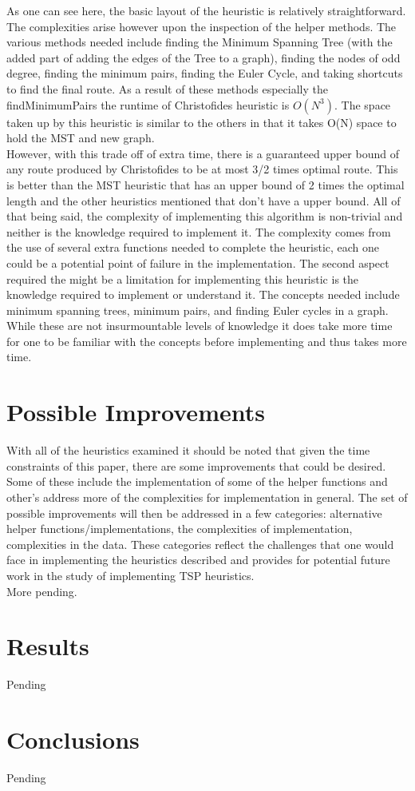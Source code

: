 \documentclass[midd]{thesis}
\newcommand{\tab}{\hspace*{2em}}
\begin{document}
\tab As one can see here, the basic layout of the heuristic is relatively straightforward. The complexities arise however upon the inspection of the helper methods. The various methods needed include finding the Minimum Spanning Tree (with the added part of adding the edges of the Tree to a graph), finding the nodes of odd degree, finding the minimum pairs, finding the Euler Cycle, and taking shortcuts to find the final route. As a result of these methods especially the findMinimumPairs the runtime of Christofides heuristic is $O(N^3)$. The space taken up by this heuristic is similar to the others in that it takes O(N) space to hold the MST and new graph. \\
\tab However, with this trade off of extra time, there is a guaranteed upper bound of any route produced by Christofides to be at most 3/2 times optimal route. This is better than the MST heuristic that has an upper bound of 2 times the optimal length and the other heuristics mentioned that don't have a upper bound. All of that being said, the complexity of implementing this algorithm is non-trivial and neither is the knowledge required to implement it. The complexity comes from the use of several extra functions needed to  complete the heuristic, each one could be a potential point of failure in the implementation. The second aspect required the might be a limitation for implementing this heuristic is the knowledge required to implement or understand it. The concepts needed include minimum spanning trees, minimum pairs, and finding Euler cycles in a graph. While these are not insurmountable levels of knowledge it does take more time for one to be familiar with the concepts before implementing and thus takes more time.\\ 

\chapter{Possible Improvements}
\tab With all of the heuristics examined it should be noted that given the time constraints of this paper, there are some improvements that could be desired. Some of these include the implementation of some of the helper functions and other's address more of the complexities for implementation in general. The set of possible improvements will then be addressed in a few categories:  alternative helper functions/implementations, the complexities of implementation, complexities in the data. These categories reflect the challenges that one would face in implementing the heuristics described and provides for potential future work in the study of implementing TSP heuristics.\\
\tab More pending.

\chapter{Results}
Pending\\
\chapter{Conclusions}
Pending\\

\end{document}
